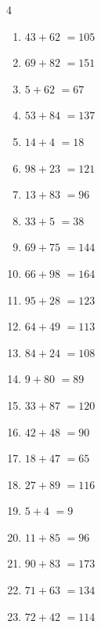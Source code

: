 \begin{multicols}{4}
\begin{enumerate}
  \item $43+62$
        $=105$

  \item $69+82$
        $=151$

  \item $5+62$
        $=67$

  \item $53+84$
        $=137$

  \item $14+4$
        $=18$

  \item $98+23$
        $=121$

  \item $13+83$
        $=96$

  \item $33+5$
        $=38$

  \item $69+75$
        $=144$

  \item $66+98$
        $=164$

  \item $95+28$
        $=123$

  \item $64+49$
        $=113$

  \item $84+24$
        $=108$

  \item $9+80$
        $=89$

  \item $33+87$
        $=120$

\columnbreak %

  \item $42+48$
        $=90$

  \item $18+47$
        $=65$

  \item $27+89$
        $=116$

  \item $5+4$
        $=9$

  \item $11+85$
        $=96$

  \item $90+83$
        $=173$

  \item $71+63$
        $=134$

  \item $72+42$
        $=114$


\end{enumerate}
\end{multicols}
